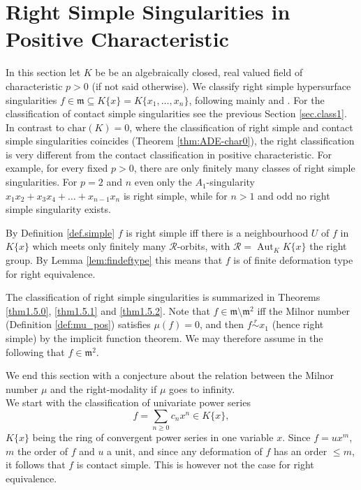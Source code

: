 \documentclass[11pt]{article}
\DeclareMathOperator{\Aut}{Aut}
\newcommand{\kr}{{\mathcal R}}
\begin{document}

\section {Right Simple Singularities in Positive Characteristic}\label{sec.class2}

In this section let $K$ be be an algebraically closed, real valued field of characteristic $p>0$ (if not said otherwise). We classify right simple hypersurface singularities $f\in \mathfrak{m}\subseteq K\{x\}=K\{x_1,\ldots,x_n\}$, following mainly  \cite{GN16} and \cite{Ng12}. For the classification of contact simple singularities see the previous Section \ref{sec.class1}. In contrast to $\mathrm{char}(K)=0$, where the classification of right simple and contact simple singularities coincides (Theorem \ref{thm:ADE-char0}), the right classification is very different from the contact classification in positive characteristic. For example, for every fixed $p>0$, there are only finitely many classes of right simple singularities. For $p=2$ and $n$ even only the $A_1$-singularity 
$x_1x_2+x_3x_4+\ldots+x_{n-1}x_n$
is right simple, while for $n>1$ and odd no right simple singularity exists.

By Definition \ref{def.simple}  $f$ is right simple iff there is a neighbourhood $U$ of $f$ in $K\{x\}$ which meets only finitely many $\mathcal{R}$-orbits, with $\kr = \Aut_KK\{x\}$ the right group.  
By Lemma \ref{lem:findeftype} this means that $f$ is of finite deformation type for right equivalence.

The classification of right simple singularities is summarized in Theorems \ref{thm1.5.0}, \ref{thm1.5.1} and \ref{thm1.5.2}.
Note that $f\in\mathfrak{m}\setminus\mathfrak{m}^2$ iff the Milnor number (Definition \ref{def:mu_pos}) satisfies $\mu(f)=0$, and then $f\overset{r }{\sim} x_1$ (hence right simple) by the implicit function theorem. We may therefore assume in the following that $f\in\mathfrak{m}^2$. 

We end this section with a conjecture about the relation between the Milnor number $\mu$ and the right-modality if $\mu$ goes to infinity.\\
 
We start with the classification of univariate power series  
$$f = \sum_{n\ge0} c_n x^n \in K\{x\},$$
$K\{x\}$ being  the ring of convergent power series in one variable $x$. Since $f=ux^m$, $m$ the order of $f$ and $u$ a unit, and since any deformation of $f$ has an order  $\le m$, it follows that $f$ is contact simple.
This is however not the case for right equivalence.\\
\end{document}
